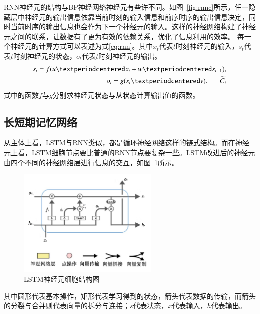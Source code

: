 RNN神经元的结构与BP神经网络神经元有些许不同。如图~\ref{fig:rnnc}所示，任一隐藏层中神经元的输出信息依靠当前时刻的输入信息和前序时序的输出信息决定，同时当前时序的输出信息也会作为下一个神经元的输入。这样的神经网络构建了神经元之间的联系，让数据有了更为有效的依赖关系，优化了信息利用的效率。
每一个神经元的计算方式可以表述为式\eqref{eq:rnn}。其中$x_t$代表$t$时刻神经元的输入，$s_t$代表$t$时刻神经元的状态，$o_t$代表$t$时刻神经元的输出。
\begin{equation}
  \begin{split}
    s_t = f(u· x_t + w · s_{t-1}), \\
    o_t = g(s_t·v).\hspace{1.8em} \widetilde{C}_t
  \end{split}
  \label{eq:rnn}
\end{equation}
式中的函数$f$与$g$分别求神经元状态与从状态计算输出值的函数。

%

\subsection{长短期记忆网络}
从主体上看，LSTM与RNN类似，都是循环神经网络这样的链式结构。而在神经元上看，LSTM细胞节点要比普通的RNN节点要复杂一些。LSTM改进后的神经元由四个不同的神经网络层进行信息的交互，如图~\ref{fig:lstmc}所示。

\begin{figure}[!htb]
  \centering
  \includegraphics[width=0.6\textwidth]{figures/lstmc.png}
  \caption{LSTM神经元细胞结构图}
  \label{fig:lstmc}
\end{figure}
\hspace{-2em}其中圆形代表基本操作，矩形代表学习得到的状态，箭头代表数据的传输，而箭头的分裂与合并则代表向量的拆分与连接；$s$代表状态，$x$代表输入，$h$代表输出。

